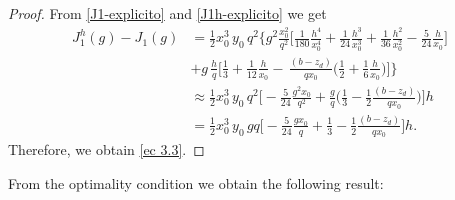 \documentclass[axioms,article,submit,moreauthors]{Definitions/mdpi}
\begin{document}
    
\begin{proof}
     From \eqref{J1-explicito} and \eqref{J1h-explicito} we get
   \[   \begin{array}{rl}
 {J^h_1}(g)-J_1(g)&= \frac{1}{2} x_0^3\, y_0 \,q^2 \Big\{g^2 \tfrac{x_0^2}{q^2} \Big[\frac{1}{180} \tfrac{h^4}{x_0^4}+\frac{1}{24}\tfrac{h^3}{x_0^3}+\frac{1}{36}\tfrac{h^2}{x_0^2}-\frac{5 }{24} \tfrac{h}{x_0}\Big] \\[0.45cm]
&    + g\,\tfrac{h}{q}  \Big[   \frac{1}{3} +  \frac{1}{12}\tfrac{h}{x_0} - \,\tfrac{(b-z_d)}{qx_0} \Big(  \frac{1}{2} + \tfrac{1}{6}\tfrac{h}{x_0} \Big) \Big] \Big\}\\[0.35cm]
&    \approx \frac{1}{2}x_0^3\, y_0\, q^2 \Big[-\frac{5}{24} \tfrac{g^2 x_0}{q^2}+\tfrac{g}{q}\Big(\tfrac{1}{3}-\tfrac{1}{2} \tfrac{(b-z_d)}{qx_0}\Big)\Big] h\\[0.45cm] 
&= \frac{1}{2}x_0^3\, y_0\,g q  \Big[-\frac{5}{24} \tfrac{g x_0}{q}+\tfrac{1}{3}-\tfrac{1}{2} \tfrac{(b-z_d)}{qx_0}\Big] h.
    \end{array}\]
    Therefore, we obtain \eqref{ec 3.3}.
\end{proof}    
   
   
  

    
     From the optimality condition we obtain the following result:
     
\end{document}
